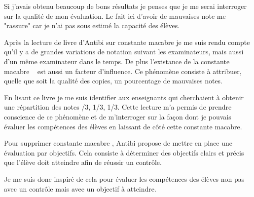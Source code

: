 Si j'avais obtenu beaucoup de bons résultats je penses que je me serai interroger sur la qualité de mon évaluation.
Le fait ici d'avoir de mauvaises note me "rassure" car je n'ai pas sous estimé la capacité des élèves.

Après la lecture de livre d'Antibi sur \og constante macabre \fg je me suis rendu compte qu'il y a de grandes variations de notation suivant les examinateurs, mais aussi d'un même examinateur dans le temps.
De plus l'existance de la \og constante macabre \fg~\cite{antibi2003constante} est aussi un facteur d'influence.
Ce phénomène consiste à attribuer, quelle que soit la qualité des copies, un pourcentage de mauvaises notes.

En lisant ce livre je me suis identifier aux enseignants qui cherchaient à obtenir une répartition des notes /3, 1/3, 1/3\fg.
Cette lecture m'a permis de prendre conscience de ce phénomène et de m'interroger sur la façon dont je pouvais évaluer les compétences des élèves en laissant de côté cette constante macabre.

Pour supprimer \og constante macabre \fg, Antibi propose de mettre en place une évaluation par objectifs.
Cela consiste à déterminer des objectifs clairs et précis que l'élève doit atteindre afin de réussir un contrôle.

Je me suis donc inspiré de cela pour évaluer les compétences des élèves non pas avec un contrôle mais avec un objectif à atteindre.
